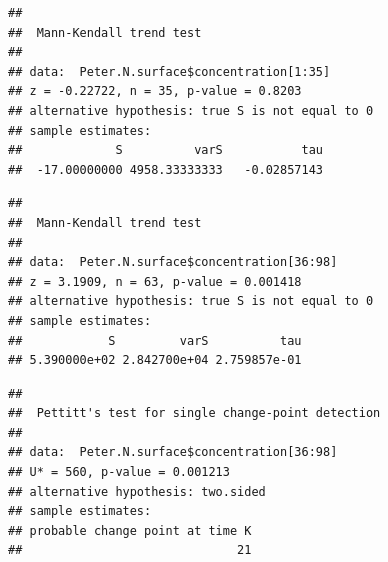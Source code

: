 \documentclass[]{article}
\newenvironment{Shaded}{\begin{snugshade}}{\end{snugshade}}
\newcommand{\KeywordTok}[1]{\textcolor[rgb]{0.13,0.29,0.53}{\textbf{#1}}}
\newcommand{\DecValTok}[1]{\textcolor[rgb]{0.00,0.00,0.81}{#1}}
\newcommand{\CommentTok}[1]{\textcolor[rgb]{0.56,0.35,0.01}{\textit{#1}}}
\newcommand{\OperatorTok}[1]{\textcolor[rgb]{0.81,0.36,0.00}{\textbf{#1}}}
\newcommand{\NormalTok}[1]{#1}
\begin{document}
\begin{verbatim}
## 
##  Mann-Kendall trend test
## 
## data:  Peter.N.surface$concentration[1:35]
## z = -0.22722, n = 35, p-value = 0.8203
## alternative hypothesis: true S is not equal to 0
## sample estimates:
##             S          varS           tau 
##  -17.00000000 4958.33333333   -0.02857143
\end{verbatim}

\begin{Shaded}
\end{Shaded}

\begin{verbatim}
## 
##  Mann-Kendall trend test
## 
## data:  Peter.N.surface$concentration[36:98]
## z = 3.1909, n = 63, p-value = 0.001418
## alternative hypothesis: true S is not equal to 0
## sample estimates:
##            S         varS          tau 
## 5.390000e+02 2.842700e+04 2.759857e-01
\end{verbatim}

\begin{Shaded}
\end{Shaded}

\begin{verbatim}
## 
##  Pettitt's test for single change-point detection
## 
## data:  Peter.N.surface$concentration[36:98]
## U* = 560, p-value = 0.001213
## alternative hypothesis: two.sided
## sample estimates:
## probable change point at time K 
##                              21
\end{verbatim}

\begin{Shaded}
\end{Shaded}
\end{document}
